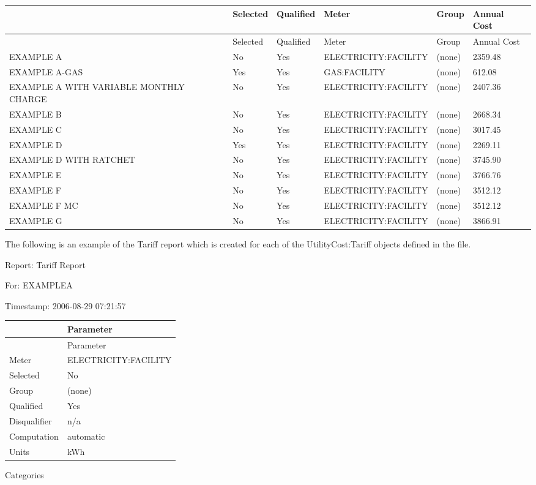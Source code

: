 {\scriptsize
\begin{longtable}[c]{>{\raggedright}p{1.0in}>{\raggedright}p{1.0in}>{\raggedright}p{1.0in}>{\raggedright}p{1.0in}>{\raggedright}p{1.0in}>{\raggedright}p{1.0in}}
\toprule
~ & Selected & Qualified & Meter & Group & Annual Cost \tabularnewline
\midrule
\endfirsthead

\toprule
~ & Selected & Qualified & Meter & Group & Annual Cost \tabularnewline
\midrule
\endhead

EXAMPLE A & No & Yes & ELECTRICITY\-:FACILITY & (none) & 2359.48 \tabularnewline
EXAMPLE A-GAS & Yes & Yes & GAS\-:FACILITY & (none) & 612.08 \tabularnewline
EXAMPLE A WITH VARIABLE MONTHLY CHARGE & No & Yes & ELECTRICITY\-:FACILITY & (none) & 2407.36 \tabularnewline
EXAMPLE B & No & Yes & ELECTRICITY\-:FACILITY & (none) & 2668.34 \tabularnewline
EXAMPLE C & No & Yes & ELECTRICITY\-:FACILITY & (none) & 3017.45 \tabularnewline
EXAMPLE D & Yes & Yes & ELECTRICITY\-:FACILITY & (none) & 2269.11 \tabularnewline
EXAMPLE D WITH RATCHET & No & Yes & ELECTRICITY\-:FACILITY & (none) & 3745.90 \tabularnewline
EXAMPLE E & No & Yes & ELECTRICITY\-:FACILITY & (none) & 3766.76 \tabularnewline
EXAMPLE F & No & Yes & ELECTRICITY\-:FACILITY & (none) & 3512.12 \tabularnewline
EXAMPLE F MC & No & Yes & ELECTRICITY\-:FACILITY & (none) & 3512.12 \tabularnewline
EXAMPLE G & No & Yes & ELECTRICITY\-:FACILITY & (none) & 3866.91 \tabularnewline
\bottomrule
\end{longtable}}

The following is an example of the Tariff report which is created for each of the UtilityCost:Tariff objects defined in the file.

Report: Tariff Report

For: EXAMPLEA

Timestamp: 2006-08-29 07:21:57

\begin{longtable}[c]{@{}ll@{}}
\toprule
~ & Parameter \tabularnewline
\midrule
\endfirsthead

\toprule
~ & Parameter \tabularnewline
\midrule
\endhead

Meter & ELECTRICITY:FACILITY \tabularnewline
Selected & No \tabularnewline
Group & (none) \tabularnewline
Qualified & Yes \tabularnewline
Disqualifier & n/a \tabularnewline
Computation & automatic \tabularnewline
Units & kWh \tabularnewline
\bottomrule
\end{longtable}

Categories

